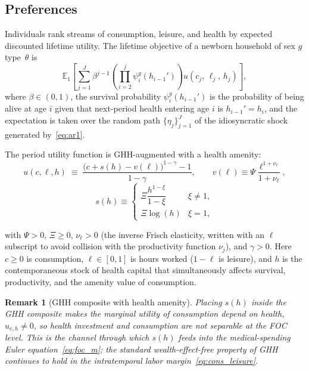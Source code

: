\documentclass[12pt,a4paper]{article}
\newcommand{\E}{\mathbb{E}}
\newtheorem{remark}{Remark}
\begin{document}
\subsection{Preferences}
\label{subsec:preferences}

Individuals rank streams of consumption, leisure, and health by expected discounted lifetime utility. The lifetime objective of a newborn household of sex $g$ type~$\theta$  is
\begin{equation}
\label{eq:lifetime_utility}
\E_1 \left[\sum_{j=1}^{J} \beta^{j-1} \left(\prod_{i=2}^{j} \psi_{i}^{g}(h_{i-1}')\right) u(c_j,\, \ell_j,\, h_j)\right],
\end{equation}
where $\beta \in (0,1)$, the survival probability $\psi_{i}^{g}(h_{i-1}')$ is the probability of being alive at age $i$ given that next-period health entering age $i$ is $h_{i-1}' = h_i$, and the expectation is taken over the random path $\{\eta_j\}_{j=1}^{J}$ of the idiosyncratic shock generated by~\eqref{eq:ar1}.
 
The period utility function is GHH-augmented with a health amenity:
\begin{equation}
\label{eq:utility}
u(c, \ell, h) \;\equiv\; \frac{\bigl(c + s(h) - v(\ell)\bigr)^{1-\gamma} - 1}{1 - \gamma},
\qquad
v(\ell) \equiv \Psi \frac{\ell^{1+\nu_\ell}}{1+\nu_\ell},
\end{equation}
\begin{equation}
    s(h) \equiv
\begin{cases}
\Xi \dfrac{h^{1-\xi}}{1-\xi} & \xi \neq 1,\\[6pt]
\Xi \log(h) & \xi = 1,
\end{cases}
\end{equation}

with $\Psi > 0$, $\Xi \geq 0$, $\nu_\ell > 0$ (the inverse Frisch elasticity, written with an $\ell$ subscript to avoid collision with the productivity function $\nu_j$), and $\gamma > 0$. Here $c \geq 0$ is consumption, $\ell \in [0, 1]$ is hours worked ($1-\ell$ is leisure), and $h$ is the contemporaneous stock of health capital that simultaneously affects survival, productivity, and the amenity value of consumption.

\begin{remark}[GHH composite with health amenity]
\label{rem:ghh_amenity}
Placing $s(h)$ inside the GHH composite makes the marginal utility of consumption depend on health, $u_{c,h} \neq 0$, so health investment and consumption are not separable at the FOC level. This is the channel through which $s(h)$ feeds into the medical-spending Euler equation~\eqref{eq:foc_m}; the standard wealth-effect-free property of GHH continues to hold in the intratemporal labor margin~\eqref{eq:cons_leisure}.
\end{remark}
\end{document}
